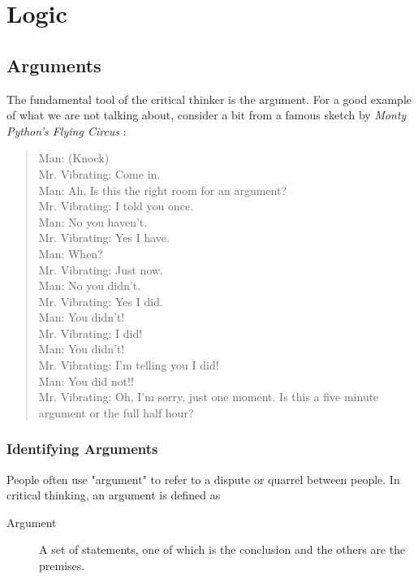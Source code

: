 \part{Logic}


\chapter{Arguments}
\label{chap:arguments}

The fundamental tool of the critical thinker is the argument. For a good example of what we are not talking about, consider a bit from a famous sketch by \emph{Monty Python's Flying Circus} \autocite{Cleese:1980aa}:

\begin{quote}
Man: (Knock)\\
Mr. Vibrating: Come in.\\
Man: Ah, Is this the right room for an argument?\\
Mr. Vibrating: I told you once.\\
Man: No you haven't.\\
Mr. Vibrating: Yes I have.\\
Man: When?\\
Mr. Vibrating: Just now.\\
Man: No you didn't.\\
Mr. Vibrating: Yes I did.\\
Man: You didn't!\\
Mr. Vibrating: I did!\\
Man: You didn't!\\
Mr. Vibrating: I'm telling you I did!\\
Man: You did not!!\\
Mr. Vibrating: Oh, I'm sorry, just one moment. Is this a five minute argument or the full half hour?\\
\end{quote}

\section{Identifying Arguments}
\label{sec:ident-argum}

People often use "argument" to refer to a dispute or quarrel between
people. In critical thinking, an argument is defined as

\begin{description}
\item[Argument] A set of statements, one of which is the conclusion and the others are the premises.
\end{description}




